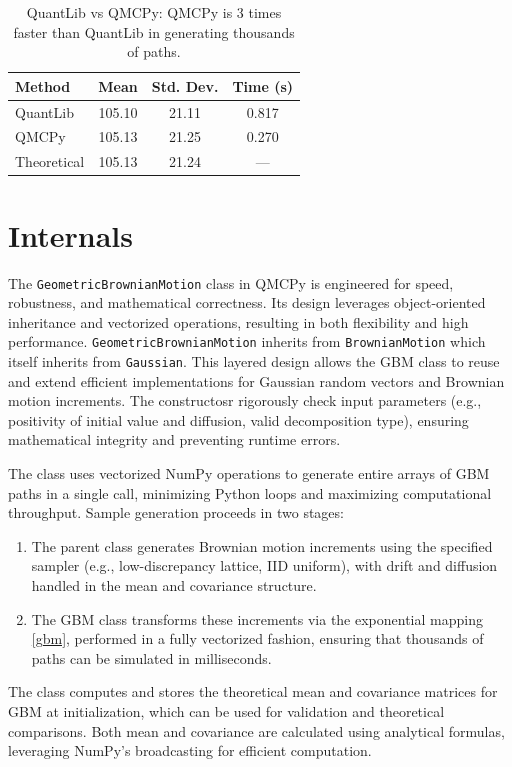 \documentclass{article}
\begin{document}
\begin{table}[t]
\centering
\caption{QuantLib vs QMCPy: QMCPy is 3 times faster than QuantLib in generating thousands of paths.}
\begin{tabular}{lccc}
\toprule
\textbf{Method} & \textbf{Mean} & \textbf{Std. Dev.} & \textbf{Time (s)}   \\
\midrule
QuantLib & 105.10 & 21.11 & 0.817  \\
QMCPy & 105.13 & 21.25 & 0.270  \\
Theoretical & 105.13 & 21.24 & ---  \\
\bottomrule
\end{tabular}
\label{tab2}
\end{table}

\section{Internals}

The \texttt{GeometricBrownianMotion} class in QMCPy is engineered for speed, robustness, and mathematical correctness. Its design leverages object-oriented inheritance and vectorized operations, resulting in both flexibility and high performance.
\texttt{GeometricBrownianMotion} inherits from \texttt{BrownianMotion} which itself inherits from \texttt{Gaussian}. This layered design allows the GBM class to reuse and extend efficient implementations for Gaussian random vectors and Brownian motion increments.
The constructosr rigorously check input parameters (e.g., positivity of initial value and diffusion, valid decomposition type), ensuring mathematical integrity and preventing runtime errors.


The class uses vectorized NumPy operations to generate entire arrays of GBM paths in a single call, minimizing Python loops and maximizing computational throughput. Sample generation proceeds in two stages:
\begin{enumerate}
\item 
The parent class generates Brownian motion increments using the specified sampler (e.g., low-discrepancy lattice, IID uniform), with drift and diffusion handled in the mean and covariance structure.
\item  The GBM class transforms these increments via the exponential mapping    \eqref{gbm}, performed in a fully vectorized fashion, ensuring that thousands of paths can be simulated in milliseconds.
\end{enumerate}
The class computes and stores the theoretical mean and covariance matrices for GBM at initialization, which can be used for validation and theoretical comparisons. Both mean and covariance are calculated using analytical formulas, leveraging NumPy’s broadcasting for efficient computation.
\end{document}
